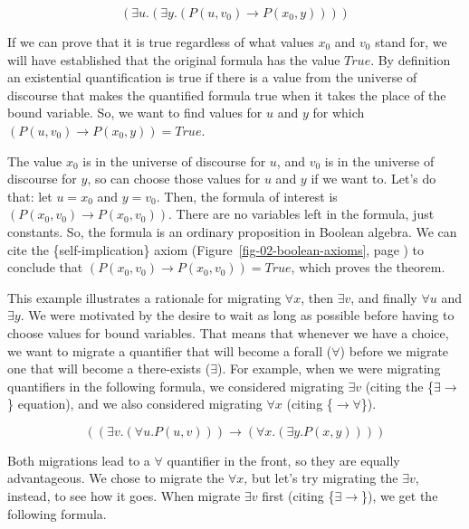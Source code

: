 {{$$(\exists u.(\exists y.(P(u, v_0) \rightarrow P(x_0, y))))$$

If we can prove that it is true regardless of what values
$x_0$ and $v_0$ stand for, we will have established that the
original formula has the value $True$.
By definition an existential quantification is true if
there is a value from the universe of discourse that
makes the quantified formula true when it takes the place of
the bound variable.
So, we want to find values for $u$ and $y$
for which $(P(u, v_0) \rightarrow P(x_0, y)) = True$.

The value $x_0$ is in the universe of discourse for $u$,
and $v_0$ is in the universe of discourse for $y$,
so can choose those values for $u$ and $y$ if we want to.
Let's do that: let $u = x_0$ and $y = v_0$.
Then, the formula of interest is $(P(x_0, v_0) \rightarrow P(x_0, v_0))$.
There are no variables left in the formula, just constants.
So, the formula is an ordinary proposition in Boolean algebra.
We can cite the \{self-implication\} axiom
(Figure~\ref{fig-02-boolean-axioms}, page \pageref{fig-02-boolean-axioms})
to conclude that $(P(x_0, v_0) \rightarrow P(x_0, v_0)) = True$,
which proves the theorem.

This example illustrates a rationale for migrating
$\forall x$, then $\exists v$, and finally $\forall u$ and $\exists y$.
We were motivated by the desire to wait as long as possible before having to
choose values for bound variables.
That means that whenever we have a choice, we want to migrate a quantifier
that will become a forall ($\forall$) before we migrate
one that will become a there-exists ($\exists$).
For example, when we were migrating quantifiers in the following formula,
we considered migrating $\exists v$ (citing the \{$\exists\rightarrow$\} equation),
and we also considered migrating $\forall x$ (citing \{$\rightarrow\forall$\}).

$$((\exists v.(\forall u.P(u, v))) \rightarrow (\forall x.(\exists y.P(x, y))))$$

Both migrations lead to a $\forall$ quantifier in the front,
so they are equally advantageous.
We chose to migrate the $\forall x$, but let's try migrating
the $\exists v$, instead, to see how it goes.
When migrate $\exists v$ first (citing \{$\exists\rightarrow$\}),
we get the following formula.

}}
